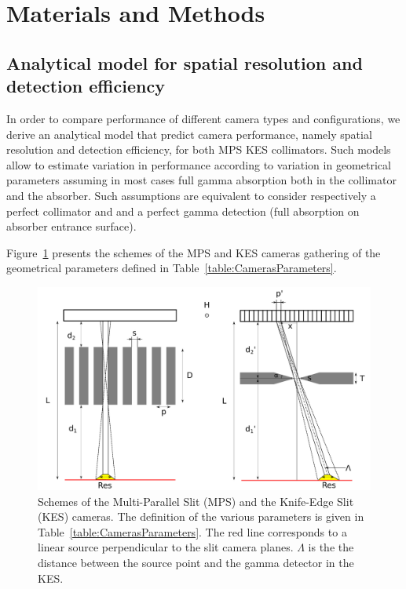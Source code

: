\documentclass[a4paper,english]{article}
\begin{document}

\section{Materials and Methods}

\subsection{Analytical model for spatial resolution and detection efficiency}


In order to compare performance of different camera types and configurations, we derive an analytical model that predict camera
performance, namely spatial resolution and detection efficiency, for both MPS KES collimators. Such models allow to estimate variation in performance according to variation in geometrical parameters assuming in most cases full gamma absorption both in the collimator and the absorber. Such assumptions are equivalent to consider respectively a perfect collimator and and a perfect gamma detection (full absorption on absorber entrance surface).

Figure~\ref{fig:CamerasParameters} presents the schemes of the MPS and KES cameras gathering of the geometrical parameters defined in Table~\ref{table:CamerasParameters}.

\begin{figure}[htbp]
    \centering
    \includegraphics[width=.8\textwidth]{MPS-KES_scheme}
    \caption{Schemes of the Multi-Parallel Slit (MPS) and the Knife-Edge Slit (KES) cameras. The definition of the various parameters is given in Table~\ref{table:CamerasParameters}. The red line corresponds to a linear source perpendicular to the slit camera planes. $\Lambda$ is the the distance between the source point and the gamma detector in the KES.}
    \label{fig:CamerasParameters}
\end{figure}    
\end{document}
